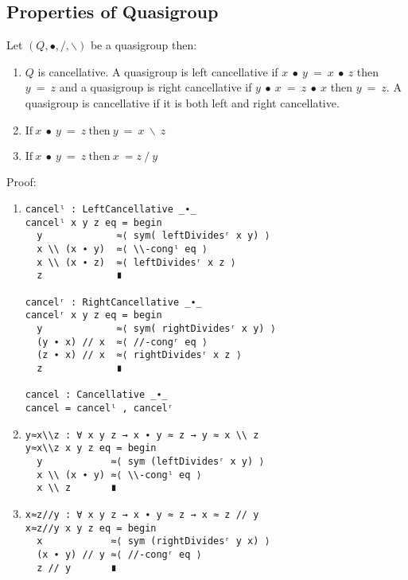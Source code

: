 \subsection{Properties of Quasigroup}
Let $(Q, ∙, /, \backslash)$ be a quasigroup then:
\begin{enumerate}
\item $Q$ is cancellative. A quasigroup is left cancellative if $x\ ∙\ y\ =\ x\ ∙\ z$ then
$y\ =\ z$ and a quasigroup is right cancellative if $y\ ∙\ x\ =\ z\ ∙\ x$ then $y\ =\ z$. A
quasigroup is cancellative if it is both left and right cancellative.
\item \(\text{If} \ x\ ∙\ y\ =\ z\ \text{then}\ y\ =\ x\ \backslash \ z\)
\item \(\text{If} \ x\ ∙\ y\ =\ z\ \text{then}\ x\ = z\ /\ y\)
\end{enumerate}
Proof:
\begin{enumerate}
\item 
\begin{verbatim}
cancelˡ : LeftCancellative _∙_
cancelˡ x y z eq = begin
  y             ≈⟨ sym( leftDividesʳ x y) ⟩
  x \\ (x ∙ y)  ≈⟨ \\-congˡ eq ⟩
  x \\ (x ∙ z)  ≈⟨ leftDividesʳ x z ⟩
  z             ∎

cancelʳ : RightCancellative _∙_
cancelʳ x y z eq = begin
  y             ≈⟨ sym( rightDividesʳ x y) ⟩
  (y ∙ x) // x  ≈⟨ //-congʳ eq ⟩
  (z ∙ x) // x  ≈⟨ rightDividesʳ x z ⟩
  z             ∎

cancel : Cancellative _∙_
cancel = cancelˡ , cancelʳ
\end{verbatim}

\item 
\begin{verbatim}
y≈x\\z : ∀ x y z → x ∙ y ≈ z → y ≈ x \\ z
y≈x\\z x y z eq = begin
  y            ≈⟨ sym (leftDividesʳ x y) ⟩
  x \\ (x ∙ y) ≈⟨ \\-congˡ eq ⟩
  x \\ z       ∎
\end{verbatim}

\item 
\begin{verbatim}
x≈z//y : ∀ x y z → x ∙ y ≈ z → x ≈ z // y
x≈z//y x y z eq = begin
  x            ≈⟨ sym (rightDividesʳ y x) ⟩
  (x ∙ y) // y ≈⟨ //-congʳ eq ⟩
  z // y       ∎
\end{verbatim}
\end{enumerate}

